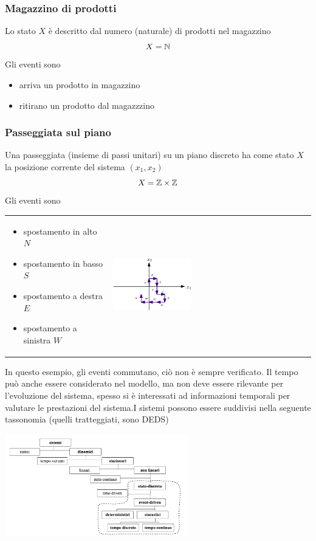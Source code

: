 \documentclass[10pt, letterpaper]{report}
\begin{document}
\subsubsection{Magazzino di prodotti}
Lo stato $X$ è descritto dal numero (naturale) di prodotti nel magazzino $$ X={\mathbb N}$$
Gli eventi sono\begin{itemize}
    \item arriva un prodotto in magazzino 
    \item ritirano un prodotto dal magazzzino 
\end{itemize}
\subsubsection{Passeggiata sul piano}
Una passeggiata (insieme di passi unitari) su un piano discreto ha come stato $X$ la posizione corrente del sistema $(x_1,x_2)$ $$ X={\mathbb Z}\times {\mathbb Z}$$ 
Gli eventi sono
\begin{center}
	\begin{tabular}{>{\centering\arraybackslash}m{3in}>{\arraybackslash}m{3in}} 
\begin{itemize}
    \item spostamento in alto $N$
    \item spostamento in basso $S$ 
    \item spostamento a destra $E$
    \item spostamento a sinistra $W$
\end{itemize}  & \includegraphics[width=0.4\textwidth]{images/randomWalk.eps}
		\\
	\end{tabular}
\end{center}
In questo esempio, gli eventi commutano, ciò non è sempre verificato. Il tempo può anche essere considerato nel modello, ma non deve essere rilevante per l'evoluzione del sistema, spesso si è interessati ad informazioni temporali per valutare le prestazioni del sistema.\acc  I sistemi possono essere suddivisi nella seguente tassonomia (quelli tratteggiati, sono DEDS)\begin{center}
    \includegraphics[width=0.6\textwidth]{images/tassonomiaSistemi.png}
\end{center}
\end{document}
